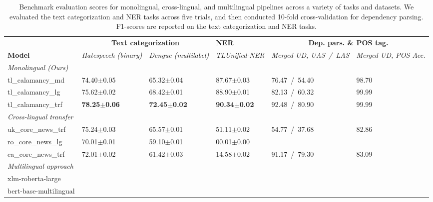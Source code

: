 \documentclass[../emnlp2023.tex]{subfiles}
\begin{document}
\begin{table*}[t]
\begin{tabular}{@{}p{4cm}p{2cm}p{2cm}p{2cm}p{2cm}p{2cm}@{}}
\toprule
                           & \multicolumn{2}{c}{\textbf{Text categorization}} & \textbf{NER} & \multicolumn{2}{c}{\textbf{Dep. pars. \& POS tag.}}                         \\ 
\textbf{Model}             & \textit{Hatespeech (binary)} & \textit{Dengue (multilabel)} & \textit{TLUnified-NER} & \textit{Merged UD, UAS~/~LAS} & \textit{Merged UD, POS Acc.} \\ \midrule 
\textit{Monolingual (Ours)}              \\
tl\_calamancy\_md   & 74.40$\pm$0.05 & 65.32$\pm$0.04 & 87.67$\pm$0.03 & 76.47~/~54.40 & 98.70\\
tl\_calamancy\_lg   & 75.62$\pm$0.02 & 68.42$\pm$0.01 & 88.90$\pm$0.01 & 82.13~/~60.32 & 99.99\\
tl\_calamancy\_trf  & \textbf{78.25$\pm$0.06} & \textbf{72.45$\pm$0.02} & \textbf{90.34$\pm$0.02} & 92.48~/~80.90 & 99.99 \\ \midrule
\textit{Cross-lingual transfer} \\
uk\_core\_news\_trf & 75.24$\pm$0.03 & 65.57$\pm$0.01 & 51.11$\pm$0.02 & 54.77~/~37.68 & 82.86 \\
ro\_core\_news\_lg  & 70.01$\pm$0.01 & 59.10$\pm$0.01 & 00.01$\pm$0.00 & \\
ca\_core\_news\_trf & 72.01$\pm$0.02 & 61.42$\pm$0.03 & 14.58$\pm$0.02 & 91.17~/~79.30 & 83.09 \\ \midrule
\textit{Multilingual approach} \\
xlm-roberta-large \\
bert-base-multilingual \\
\bottomrule
\end{tabular}
\caption{
    Benchmark evaluation scores for monolingual, cross-lingual, and multilingual pipelines across a variety of tasks and datasets.
    We evaluated the text categorization and NER tasks across five trials, and then conducted 10-fold cross-validation for dependency parsing.
    F1-scores are reported on the text categorization and NER tasks.
}
\label{table:results}
\end{table*}
\end{document}
